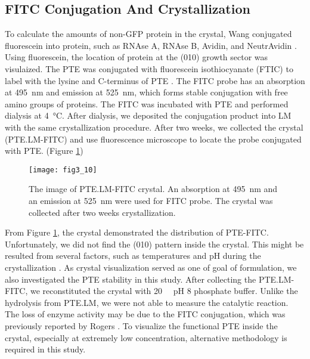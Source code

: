 \begin{refsection}
\subsection{FITC Conjugation And Crystallization}

To calculate the amounts of non-GFP protein in the crystal, Wang 
conjugated fluorescein into protein, such as RNAse A, RNAse B, Avidin, and
NeutrAvidin \cite{Wang2001a}. Using fluorescein, the location of protein at the
(010) growth sector was visulaized. The PTE was conjugated with fluorescein
isothiocyanate (FTIC) to label with the lysine and C-terminus of PTE
\cite{Rogers1999}. The FITC probe has an absorption at \SI{495}{\nm} and
emission at \SI{525}{\nm}, which forms stable conjugation with free amino
groups of proteins. 
The FITC was incubated with PTE and performed dialysis at \SI{4}{\celsius}. After
dialysis, we deposited the conjugation product into LM with the same
crystallization procedure. After two weeks, we collected the crystal
(PTE.LM-FITC) and use fluorescence microscope to locate the probe conjugated
with PTE. (Figure \ref{fig:ptelm-fitc})
\begin{figure}[htbp] \centering \texttt{[image: fig3\_10]} 
    \caption[The image of PTE.LM-FITC crystal. An absorption at \SI{495}{\nm}
    and an emission at \SI{525}{\nm} were used for FITC probe. The crystal was
collected after two weeks crystallization.]{The image of PTE.LM-FITC crystal.
    An absorption at \SI{495}{\nm} and an emission at \SI{525}{\nm} were used
for FITC probe. The crystal was collected after two weeks crystallization.}
\label{fig:ptelm-fitc} 
\end{figure}

From Figure \ref{fig:ptelm-fitc}, the crystal demonstrated the distribution of
PTE-FITC. Unfortunately, we did not find the (010) pattern inside the crystal.
This might be resulted from several factors, such as temperatures and pH during
the crystallization \cite{Wong2014}. As crystal visualization served as one of
goal of formulation, we also investigated the PTE stability in this study.
After collecting the PTE.LM-FITC, we reconstituted the crystal with
\SI{20}{\milli\Molar} pH 8 phosphate buffer. Unlike the hydrolysis from PTE.LM,
we were not able to measure the catalytic reaction. The loss of enzyme activity
may be due to the FITC conjugation, which was previously reported by
Rogers  \cite{Rogers1999}. To visualize the functional PTE inside
the crystal, especially at extremely low concentration, alternative methodology
is required in this study.


\end{refsection}
